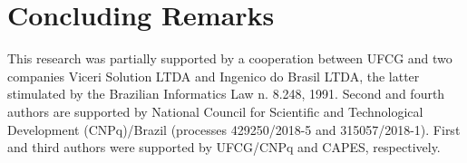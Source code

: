 \documentclass{sbc2019}%
\begin{document}
\section{Concluding Remarks}
\label{sec:conclud}



\begin{acknowledgements}
This research was partially supported by a cooperation between
UFCG and two companies Viceri Solution LTDA
and Ingenico do Brasil LTDA, the latter stimulated by the
Brazilian Informatics Law n. 8.248, 1991. Second and fourth authors are supported by National Council for Scientific and Technological Development
(CNPq)/Brazil (processes 429250/2018-5 and 315057/2018-1). First and third authors were supported by UFCG/CNPq and CAPES, respectively.
\end{acknowledgements}




\end{document}
